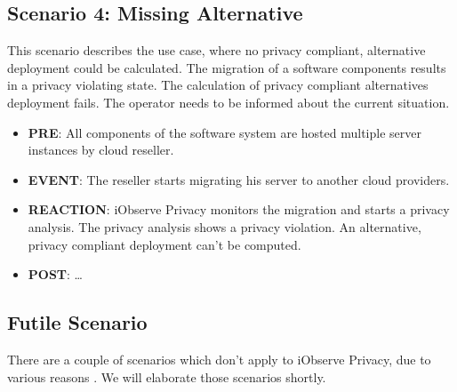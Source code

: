 \subsection{Scenario 4: Missing Alternative}
\label{eval:scenario:4}
This scenario describes the use case, where no privacy compliant, alternative deployment could be calculated. The migration of a software components results in a privacy violating state. The calculation of privacy compliant alternatives deployment fails. The operator needs to be informed about the current situation.
\begin{itemize}
	\setlength\itemsep{0em}
	\item \textbf{PRE}: All components of the software system are hosted multiple server instances by cloud reseller. 
	\item \textbf{EVENT}: The reseller starts migrating his server to another cloud providers.
	\item \textbf{REACTION}: iObserve Privacy monitors the migration and starts a privacy analysis. The privacy analysis shows a privacy violation. An alternative, privacy compliant deployment can't be computed.
	\item \textbf{POST}: \dots
\end{itemize}


\subsection{Futile Scenario}
There are a couple of scenarios which don't apply to iObserve Privacy, due to various reasons \cite{Heinrich.2016b}. We will elaborate those scenarios shortly.

